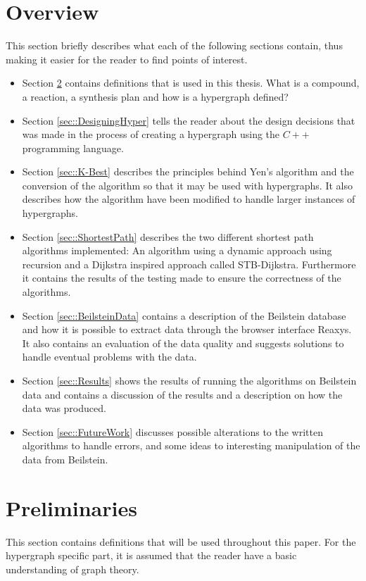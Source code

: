 \documentclass[a4paper,10pt,titlepage]{paper}
\begin{document}
\section{Overview}
This section briefly describes what each of the following sections contain, thus making it easier for the reader to find points of interest.
\begin{itemize}
\item
Section \ref{sec::Preliminaries} contains definitions that is used in this thesis. What is a compound, a reaction, a synthesis plan and how is a hypergraph defined?
\item
Section \ref{sec::DesigningHyper} tells the reader about the design decisions that was made in the process of creating a hypergraph using the $C++$ programming language. 
\item
Section \ref{sec::K-Best} describes the principles behind Yen's algorithm and the conversion of the algorithm so that it may be used with hypergraphs. It also describes how the algorithm have been modified to handle larger instances of hypergraphs.
\item
Section \ref{sec::ShortestPath} describes the two different shortest path algorithms implemented: An algorithm using a dynamic approach using recursion\cite{Carsten} and a Dijkstra inspired approach called STB-Dijkstra\cite{Nielsen}. Furthermore it contains the results of the testing made to ensure the correctness of the algorithms.
\item
Section \ref{sec::BeilsteinData} contains a description of the Beilstein database and how it is possible to extract data through the browser interface Reaxys. It also contains an evaluation of the data quality and suggests solutions to handle eventual problems with the data.
\item
Section \ref{sec::Results} shows the results of running the algorithms on Beilstein data and contains a discussion of the results and a description on how the data was produced.
\item 
Section \ref{sec::FutureWork} discusses possible alterations to the written algorithms to handle errors, and some ideas to interesting manipulation of the data from Beilstein.
\end{itemize}

\section{Preliminaries}
\label{sec::Preliminaries}

This section contains definitions that will be used throughout this paper. For the hypergraph specific part, it is assumed that the reader have a basic understanding of graph theory. 
\end{document}
